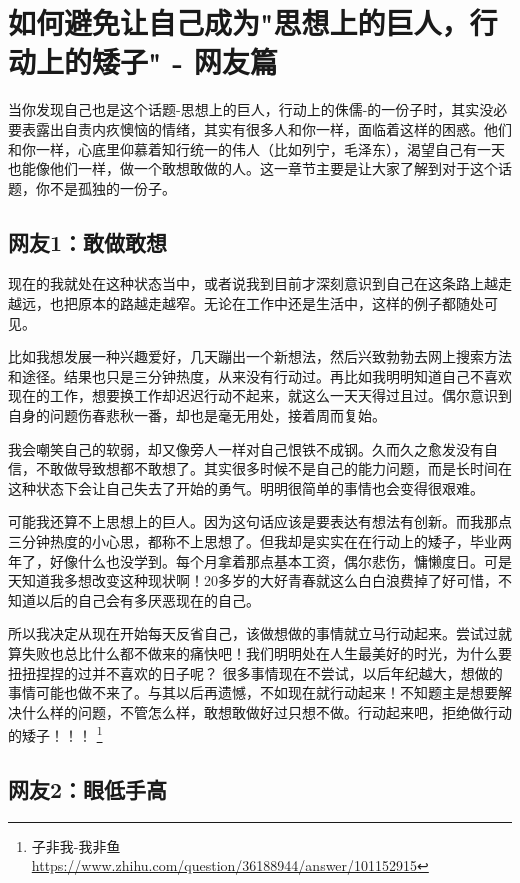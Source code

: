 \chapter{如何避免让自己成为"思想上的巨人，行动上的矮子" - 网友篇}

当你发现自己也是这个话题-思想上的巨人，行动上的侏儒-的一份子时，其实没必要表露出自责内疚懊恼的情绪，其实有很多人和你一样，面临着这样的困惑。他们和你一样，心底里仰慕着知行统一的伟人（比如列宁，毛泽东），渴望自己有一天也能像他们一样，做一个敢想敢做的人。这一章节主要是让大家了解到对于这个话题，你不是孤独的一份子。

\section{网友1：敢做敢想}

现在的我就处在这种状态当中，或者说我到目前才深刻意识到自己在这条路上越走越远，也把原本的路越走越窄。无论在工作中还是生活中，这样的例子都随处可见。

比如我想发展一种兴趣爱好，几天蹦出一个新想法，然后兴致勃勃去网上搜索方法和途径。结果也只是三分钟热度，从来没有行动过。再比如我明明知道自己不喜欢现在的工作，想要换工作却迟迟行动不起来，就这么一天天得过且过。偶尔意识到自身的问题伤春悲秋一番，却也是毫无用处，接着周而复始。

我会嘲笑自己的软弱，却又像旁人一样对自己恨铁不成钢。久而久之愈发没有自信，不敢做导致想都不敢想了。其实很多时候不是自己的能力问题，而是长时间在这种状态下会让自己失去了开始的勇气。明明很简单的事情也会变得很艰难。

可能我还算不上思想上的巨人。因为这句话应该是要表达有想法有创新。而我那点三分钟热度的小心思，都称不上思想了。但我却是实实在在行动上的矮子，毕业两年了，好像什么也没学到。每个月拿着那点基本工资，偶尔悲伤，慵懒度日。可是天知道我多想改变这种现状啊！20多岁的大好青春就这么白白浪费掉了好可惜，不知道以后的自己会有多厌恶现在的自己。

所以我决定从现在开始每天反省自己，该做想做的事情就立马行动起来。尝试过就算失败也总比什么都不做来的痛快吧！我们明明处在人生最美好的时光，为什么要扭扭捏捏的过并不喜欢的日子呢？ 很多事情现在不尝试，以后年纪越大，想做的事情可能也做不来了。与其以后再遗憾，不如现在就行动起来！不知题主是想要解决什么样的问题，不管怎么样，敢想敢做好过只想不做。行动起来吧，拒绝做行动的矮子！！！
\footnote{子非我-我非鱼 \quad \url{https://www.zhihu.com/question/36188944/answer/101152915}}


\section{网友2：眼低手高}


